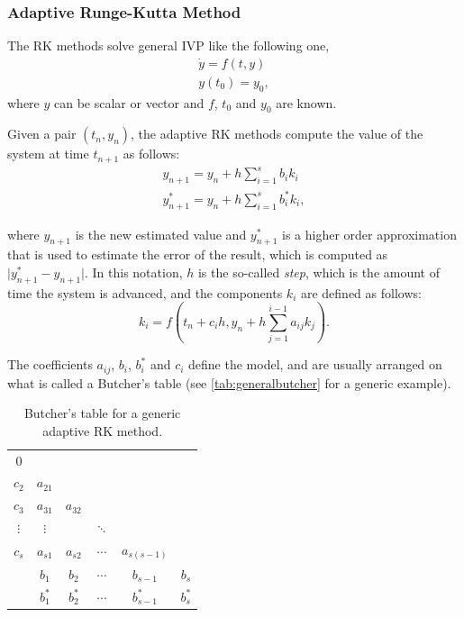 \subsubsection*{Adaptive Runge-Kutta Method}

The \ac{RK} methods solve general \ac{IVP} like the following one,
\begin{align*}
\dot{y} = f(t,y) \\
y(t_0) = y_0,
\end{align*}
where $y$ can be scalar or vector and $f$, $t_0$ and $y_0$ are known.

Given a pair $(t_n, y_n)$, the adaptive \ac{RK} methods compute the value of the system at time $t_{n+1}$ as follows:
\begin{align*}
y_{n+1} = y_n + h \sum_{i=1}^s b_i k_i\\
y^*_{n+1} = y_n + h \sum_{i=1}^s b^*_i k_i,
\end{align*}

where $y_{n+1}$ is the new estimated value and $y^*_{n+1}$ is a higher order approximation that is used to estimate the error of the result, which is computed as $\vert y^*_{n+1} - y_{n+1} \vert$. In this notation, $h$ is the so-called \emph{step}, which is the amount of time the system is advanced, and the components $k_i$ are defined as follows:
\[
k_i = f(t_n + c_ih, y_n + h\sum_{j=1}^{i-1} a_{ij} k_j).
\]

The coefficients $a_{ij}$, $b_i$, $b_i^*$ and $c_i$ define the model, and are usually arranged on what is called a Butcher's table (see \autoref{tab:generalbutcher} for a generic example).

\begin{table}[bth]
	\myfloatalign
	\begin{tabularx}{.54\textwidth}{c|ccccc}
		$0$&  & & & & \\
		$c_2$& $a_{21}$ & & & & \\
		$c_3$& $a_{31}$ & $a_{32}$ & & & \\
		$\vdots$& $\vdots$ &  & $\ddots$ & & \\
		$c_s$& $a_{s1}$  & $a_{s2}$ & $\cdots$ & $a_{s(s-1)}$ & \\ \hline
		& $b_1$ & $b_2$ & $\cdots$ & $b_{s-1}$ & $b_s$ \\ \hline
		& $b^*_1$ & $b^*_2$ & $\cdots$ & $b^*_{s-1}$ & $b^*_s$ \\
	\end{tabularx}
	\caption[Butcher's table for an adaptive RK method]{Butcher's table for a generic adaptive \ac{RK} method.}
	\label{tab:generalbutcher}
\end{table}

